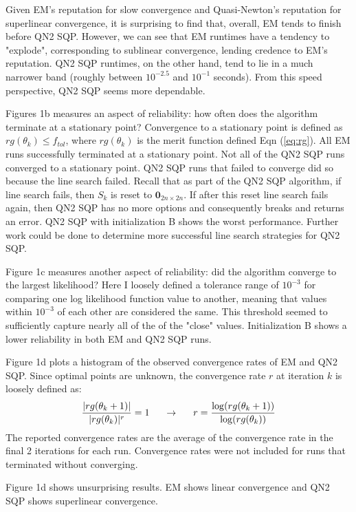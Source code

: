 \documentclass[letter,12pt]{article}
\begin{document}
Given EM's reputation for slow convergence and Quasi-Newton's reputation for superlinear convergence, it is surprising to find that, overall, EM tends to finish before QN2 SQP.  However, we can see that EM runtimes have a tendency to "explode", corresponding to sublinear convergence, lending credence to EM's reputation.  QN2 SQP runtimes, on the other hand, tend to lie in a much narrower band (roughly between $10^{-2.5}$ and $10^{-1}$ seconds).  From this speed perspective, QN2 SQP seems more dependable.

Figures 1b measures an aspect of reliability: how often does the algorithm terminate at a stationary point?  Convergence to a stationary point is defined as $rg(\theta_k) \leq f_{tol}$, where $rg(\theta_k)$ is the merit function defined Eqn (\ref{eq:rg}).  All EM runs successfully terminated at a stationary point.  Not all of the QN2 SQP runs converged to a stationary point.  QN2 SQP runs that failed to converge did so because the line search failed.  Recall that as part of the QN2 SQP algorithm, if line search fails, then $S_k$ is reset to $\boldsymbol{0}_{2n \times 2n}$.  If after this reset line search fails again, then QN2 SQP has no more options and consequently breaks and returns an error.  QN2 SQP with initialization B shows the worst performance.  Further work could be done to determine more successful line search strategies for QN2 SQP.

Figure 1c measures another aspect of reliability: did the algorithm converge to the largest likelihood?  Here I loosely defined a tolerance range of $10^{-3}$ for comparing one log likelihood function value to another, meaning that values within $10^{-3}$ of each other are considered the same.  This threshold seemed to sufficiently capture nearly all of the of the "close" values.  Initialization B shows a lower reliability in both EM and QN2 SQP runs.

Figure 1d plots a histogram of the observed convergence rates of EM and QN2 SQP.  Since optimal points are unknown, the convergence rate $r$ at iteration $k$ is loosely defined as:
\[
\frac{|rg(\theta_k+1)|}{|rg(\theta_k)|^r} = 1
\indent
\rightarrow
\indent
r = \frac{\log(rg(\theta_k+1))}{\log(rg(\theta_k))}
\]
The reported convergence rates are the average of the convergence rate in the final 2 iterations for each run.  Convergence rates were not included for runs that terminated without converging.

Figure 1d shows unsurprising results.  EM shows linear convergence and QN2 SQP shows superlinear convergence.
\end{document}
